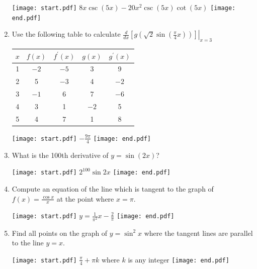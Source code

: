 \documentclass[12pt]{article}
\begin{document}
\begin{enumerate}
\texttt{[image: start.pdf]}
{{$8x\csc{(5x)}-20x^2\csc{(5x)}\cot{(5x)}$}}
\texttt{[image: end.pdf]}


\item Use the following table to calculate $\left.\frac{d}{dx}\left[g\left(\sqrt{2}\sin{\left(\frac{\pi}{4}x\right)}\right)\right]\right|_{x=3}$

\begin{center}
\begin{tabular}{c|c|c|c|c}
$x$ & $f(x)$ & $f^{\prime}(x)$ & $g(x)$ & $g^{\prime}(x)$\\
\hline
1 & $-2$ & $-5$ & 3 & 9\\
2& 5 & $-3$ & 4 & $-2$\\
3 & $-1$ & 6  & 7 & $-6$\\
4 & 3 & 1 & $-2$ & 5\\
5 & 4 & 7 & 1 & 8
\end{tabular}
\end{center}

\texttt{[image: start.pdf]}
{{$-\frac{9\pi}{4}$}}
\texttt{[image: end.pdf]}


\item What is the 100th derivative of $y=\sin{(2x)}$?

\texttt{[image: start.pdf]}
{{$2^{100}\sin{2x}$}}
\texttt{[image: end.pdf]}


\item Compute an equation of the line which is tangent to the graph of $f(x)=\frac{\cos{x}}{x}$ at the point where $x=\pi$.

\texttt{[image: start.pdf]}
{{$y=\frac{1}{\pi^2}x-\frac{2}{\pi}$}}
\texttt{[image: end.pdf]}


\item Find all points on the graph of $y=\sin^2{x}$ where the tangent lines are parallel to the line $y=x$.

\texttt{[image: start.pdf]}
{{$\frac{\pi}{4}+\pi k$ where $k$ is any integer}}
\texttt{[image: end.pdf]}


\end{enumerate}

\newpage

\end{document}
